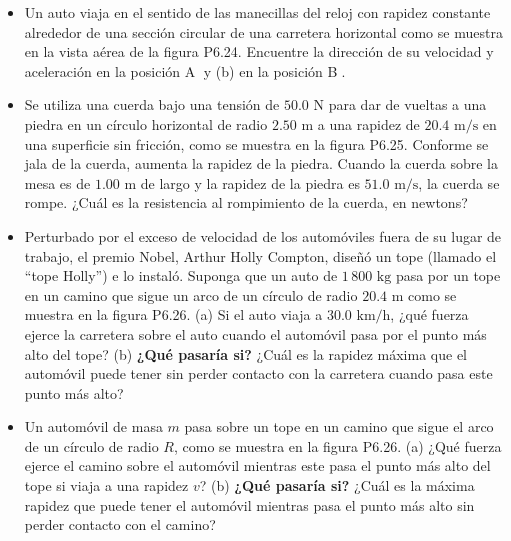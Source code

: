 \documentclass[11pt,a4paper]{article}
\begin{document}
\begin{itemize}
    \item[\textbf{24.}] Un auto viaja en el sentido de las manecillas del reloj con rapidez constante alrededor de una sección circular de una carretera horizontal como se muestra en la vista aérea de la figura P6.24. Encuentre la dirección de su velocidad y aceleración en la posición \textcircled{A} y (b) en la posición \textcircled{B}.
    \vspace*{6cm}

    \item[\textbf{25.}] Se utiliza una cuerda bajo una tensión de $50.0 \text{ N}$ para dar de vueltas a una piedra en un círculo horizontal de radio $2.50 \text{ m} $ a una rapidez de $20.4 \text{ m/s}$ en una superficie sin fricción, como se muestra en la figura P6.25. Conforme se jala de la cuerda, aumenta la rapidez de la piedra. Cuando la cuerda sobre la mesa es de $1.00 \text{ m}$ de largo y la rapidez de la piedra es $51.0 \text{ m/s}$, la cuerda se rompe. ¿Cuál es la resistencia al rompimiento de la cuerda, en newtons?
    \vspace*{6cm}

    \item[\textbf{26.}] Perturbado por el exceso de velocidad de los automóviles fuera de su lugar de trabajo, el premio Nobel, Arthur Holly Compton, diseñó un tope (llamado el ``tope Holly'') e lo instaló. Suponga que un auto de $1\,800 \text{ kg}$ pasa por un tope en un camino que sigue un arco de un círculo de radio $20.4 \text{ m}$ como se muestra en la figura P6.26. (a) Si el auto viaja a $30.0 \text{ km/h}$, ¿qué fuerza ejerce la carretera sobre el auto cuando el automóvil pasa por el punto más alto del tope? (b) \textbf{¿Qué pasaría si?} ¿Cuál es la rapidez máxima que el automóvil puede tener sin perder contacto con la carretera cuando pasa este punto más alto?
    \vspace*{7cm}

    \item[\textbf{27.}] Un automóvil de masa $m$ pasa sobre un tope en un camino que sigue el arco de un círculo de radio $R$, como se muestra en la figura P6.26. (a) ¿Qué fuerza ejerce el camino sobre el automóvil mientras este pasa el punto más alto del tope si viaja a una rapidez $v$? (b) \textbf{¿Qué pasaría si?} ¿Cuál es la máxima rapidez que puede tener el automóvil mientras pasa el punto más alto sin perder contacto con el camino?
    \vspace*{6cm}
\end{itemize}
\end{document}

